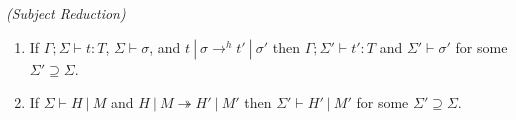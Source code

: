 \begin{thmun}
\emph{(Subject Reduction)}

\begin{enumerate}

\item If $\Gamma ; \Sigma \vdash t : T$, $\Sigma \vdash \sigma$, and $t~|~\sigma \rightarrow^h t'~|~\sigma'$ then $\Gamma ; \Sigma' \vdash t' : T$ and $\Sigma' \vdash \sigma'$ for some $\Sigma' \supseteq \Sigma$.

\item If $\Sigma \vdash H~|~M$ and $H~|~M \twoheadrightarrow H'~|~M'$ then $\Sigma' \vdash H'~|~M'$ for some $\Sigma' \supseteq \Sigma$.

\end{enumerate}

\end{thmun}
